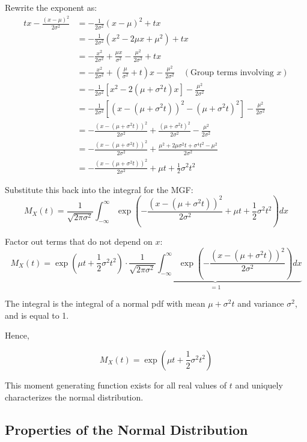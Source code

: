 \documentclass[twoside]{book}
\begin{document}
Rewrite the exponent as:
\begin{align*}
tx - \frac{(x-\mu)^2}{2\sigma^2} &= -\frac{1}{2\sigma^2} (x-\mu)^2 + tx\\
&=-\frac{1}{2\sigma^2} (x^2 - 2\mu x + \mu^2) + t x\\
&=-\frac{x^2}{2\sigma^2} + \frac{\mu x}{\sigma^2} - \frac{\mu^2}{2\sigma^2} + t x \\
&=-\frac{x^2}{2\sigma^2} + \left(\frac{\mu}{\sigma^2} + t\right) x - \frac{\mu^2}{2\sigma^2} \quad (\text{Group terms involving } x)\\
&=-\frac{1}{2\sigma^2} \left[x^2 - 2 (\mu + \sigma^2 t) x \right] - \frac{\mu^2}{2\sigma^2}\\
&=-\frac{1}{2\sigma^2} \left[(x - (\mu + \sigma^2 t))^2 - (\mu + \sigma^2 t)^2 \right] - \frac{\mu^2}{2\sigma^2}\\
&=-\frac{(x - (\mu + \sigma^2 t))^2}{2\sigma^2} + \frac{(\mu + \sigma^2 t)^2}{2\sigma^2} - \frac{\mu^2}{2\sigma^2}\\
&=-\frac{(x - (\mu + \sigma^2 t))^2}{2\sigma^2} + \frac{\mu^2 + 2 \mu \sigma^2 t + \sigma^4 t^2 - \mu^2}{2 \sigma^2}\\
&=-\frac{(x - (\mu + \sigma^2 t))^2}{2\sigma^2} + \mu t + \frac{1}{2} \sigma^2 t^2
\end{align*}

Substitute this back into the integral for the MGF:
\[
M_X(t) = \frac{1}{\sqrt{2 \pi \sigma^2}} \int_{-\infty}^\infty \exp\left(-\frac{(x - (\mu + \sigma^2 t))^2}{2\sigma^2} + \mu t + \frac{1}{2} \sigma^2 t^2 \right) dx
\]

Factor out terms that do not depend on \(x\):
\[
M_X(t) = \exp\left(\mu t + \frac{1}{2} \sigma^2 t^2\right) \cdot \underbrace{\frac{1}{\sqrt{2 \pi \sigma^2}} \int_{-\infty}^\infty \exp\left(-\frac{(x - (\mu + \sigma^2 t))^2}{2\sigma^2}\right) dx}_{= 1}
\]

The integral is the integral of a normal pdf with mean \(\mu + \sigma^2 t\) and variance \(\sigma^2\), and is equal to 1.

Hence,

\begin{textbox}
\[
M_X(t) = \exp\left(\mu t + \frac{1}{2} \sigma^2 t^2 \right)
\]
\end{textbox}

This moment generating function exists for all real values of \(t\) and uniquely characterizes the normal distribution.



\subsection{Properties of the Normal Distribution}
\end{document}

